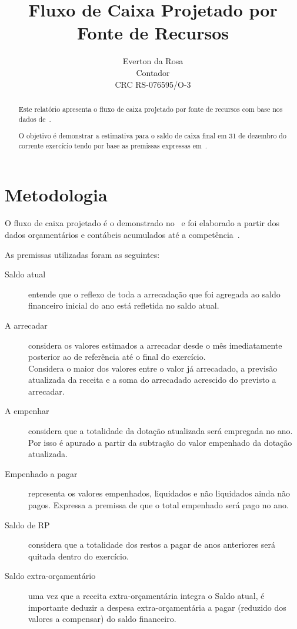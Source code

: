 \documentclass[12pt, a4paper]{report}
\title{Fluxo de Caixa Projetado por Fonte de Recursos}
\author{
	Everton da Rosa\\
	Contador\\
	CRC RS-076595/O-3
}
\begin{document}
\maketitle

\begin{abstract}

Este relatório apresenta o fluxo de caixa projetado por fonte de recursos com base nos dados de~\thedate.

O objetivo é demonstrar a estimativa para o saldo de caixa final em 31 de dezembro do corrente exercício tendo por base as premissas expressas em~.

\end{abstract}




\chapter*{Metodologia} \label{ch:metodologia}

O fluxo de caixa projetado é o demonstrado no~ e foi elaborado a partir dos dados orçamentários e contábeis acumulados até a competência~\thedate.

As premissas utilizadas foram as seguintes:

\begin{description}
\item[Saldo atual] entende que o reflexo de toda a arrecadação que foi agregada ao saldo financeiro inicial do ano está refletida no saldo atual.

\item[A arrecadar] considera os valores estimados a arrecadar desde o mês imediatamente posterior ao de referência até o final do exercício.\\Considera o maior dos valores entre o valor já arrecadado, a previsão atualizada da receita e a soma do arrecadado acrescido do previsto a arrecadar.

\item[A empenhar] considera que a totalidade da dotação atualizada será empregada no ano. Por isso é apurado a partir da subtração do valor empenhado da dotação atualizada.

\item[Empenhado a pagar] representa os valores empenhados, liquidados e não liquidados ainda não pagos. Expressa a premissa de que o total empenhado será pago no ano.

\item[Saldo de RP] considera que a totalidade dos restos a pagar de anos anteriores será quitada dentro do exercício.

\item[Saldo extra-orçamentário] uma vez que a receita extra-orçamentária integra o Saldo atual, é importante deduzir a despesa extra-orçamentária a pagar (reduzido dos valores a compensar) do saldo financeiro.
\end{description}
\end{document}
